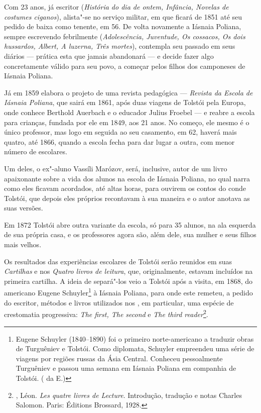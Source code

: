 Com 23 anos, já escritor (\emph{História do dia de ontem,
Infância, Novelas de costumes ciganos}), alista"-se no serviço
militar, em que ficará de 1851 até seu pedido de baixa como
tenente, em 56. De volta novamente a Iásnaia Poliana, sempre
escrevendo febrilmente (\emph{Adolescência, Juventude, Os
cossacos, Os dois hussardos, Albert, A luzerna, Três mortes}),
contempla seu passado em seus diários --- prática esta que jamais
abandonará --- e decide fazer algo concretamente válido para seu
povo, a começar pelos filhos dos camponeses de Iásnaia Poliana.

Já em 1859 elabora o projeto de uma revista pedagógica ---
\emph{Revista da Escola de Iásnaia Poliana}, que sairá
em 1861, após duas viagens de Tolstói pela Europa, onde
conhece Berthold Auerbach e o educador Julius Froebel ---
e reabre a escola para crianças, fundada por ele em 1849,
aos 21 anos. No começo, ele mesmo é o único professor, mas
logo em seguida ao seu casamento, em 62, haverá mais quatro,
até 1866, quando a escola fecha para dar lugar a outra, com
menor número de escolares.

Um deles, o ex"-aluno Vassíli Marózov, será, inclusive, autor de
um livro apaixonante sobre a vida dos alunos na escola de Iásnaia
Poliana, no qual narra como eles ficavam acordados, até altas
horas, para ouvirem os contos do conde Tolstói, que depois eles
próprios recontavam à sua maneira e o autor anotava as suas
versões.

Em 1872 Tolstói abre outra variante da escola, só para 35 alunos,
na ala esquerda de sua própria casa, e os professores agora são,
além dele, sua mulher e seus filhos mais velhos.

Os resultados das experiências escolares de Tolstói serão
reunidos em suas \emph{Cartilhas} e nos \emph{Quatro livros
de leitura}, que, originalmente, estavam incluídos na primeira
cartilha. A ideia de separá"-los veio a Tolstói após a visita,
em 1868, do americano Eugene Schuyler\footnote{Eugene Schuyler
(1840--1890) foi o primeiro norte-americano a traduzir obras de
Turguêniev e Tolstói. Como diplomata, Schuyler empreendeu uma
série de viagens por regiões russas da Ásia Central. Conheceu
pessoalmente Turguêniev e passou uma semana em Iásnaia Poliana
em companhia de Tolstói. ( da {E.})} à Iásnaia Poliana,
para onde este remeteu, a pedido do escritor, métodos e livros
utilizados nos , em particular, uma espécie de
crestomatia progressiva: \emph{The first, The second} e \emph{The third
reader}\footnote{, Léon. \emph{Les quatre livres de
Lecture}. Introdução, tradução e notas Charles Salomon. Paris:
Éditions Brossard, 1928.}.

